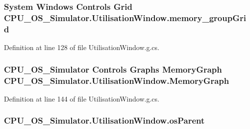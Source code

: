 \subsubsection[{memory\+\_\+group\+Grid}]{\setlength{\rightskip}{0pt plus 5cm}System Windows Controls Grid C\+P\+U\+\_\+\+O\+S\+\_\+\+Simulator.\+Utilisation\+Window.\+memory\+\_\+group\+Grid\hspace{0.3cm}{\ttfamily [package]}}\label{class_c_p_u___o_s___simulator_1_1_utilisation_window_a4fb6d1f6970846264f1de50929230664}


Definition at line 128 of file Utilisation\+Window.\+g.\+cs.

\hypertarget{class_c_p_u___o_s___simulator_1_1_utilisation_window_aa26e672bc20df2926cc39de95dca5577}{}
\subsubsection[{Memory\+Graph}]{\setlength{\rightskip}{0pt plus 5cm}C\+P\+U\+\_\+\+O\+S\+\_\+\+Simulator Controls Graphs {\bf Memory\+Graph} C\+P\+U\+\_\+\+O\+S\+\_\+\+Simulator.\+Utilisation\+Window.\+Memory\+Graph\hspace{0.3cm}{\ttfamily [package]}}\label{class_c_p_u___o_s___simulator_1_1_utilisation_window_aa26e672bc20df2926cc39de95dca5577}


Definition at line 144 of file Utilisation\+Window.\+g.\+cs.

\hypertarget{class_c_p_u___o_s___simulator_1_1_utilisation_window_a6531ca69e7a27ff9c1f6081fef343c6f}{}
\subsubsection[{os\+Parent}]{ C\+P\+U\+\_\+\+O\+S\+\_\+\+Simulator.\+Utilisation\+Window.\+os\+Parent\hspace{0.3cm}{\ttfamily [private]}}\label{class_c_p_u___o_s___simulator_1_1_utilisation_window_a6531ca69e7a27ff9c1f6081fef343c6f}


